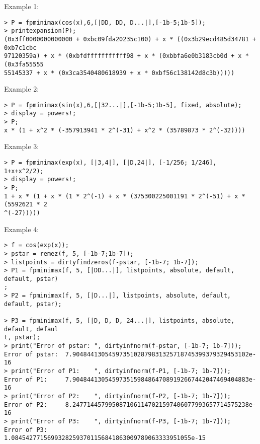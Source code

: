 \noindent Example 1: 
\begin{center}\begin{minipage}{15cm}\begin{Verbatim}[frame=single]
> P = fpminimax(cos(x),6,[|DD, DD, D...|],[-1b-5;1b-5]);
> printexpansion(P);
(0x3ff0000000000000 + 0xbc09fda20235c100) + x * ((0x3b29ecd485d34781 + 0xb7c1cbc
97120359a) + x * (0xbfdfffffffffff98 + x * (0xbbfa6e0b3183cb0d + x * (0x3fa55555
55145337 + x * (0x3ca3540480618939 + x * 0xbf56c138142d8c3b)))))
\end{Verbatim}
\end{minipage}\end{center}
\noindent Example 2: 
\begin{center}\begin{minipage}{15cm}\begin{Verbatim}[frame=single]
> P = fpminimax(sin(x),6,[|32...|],[-1b-5;1b-5], fixed, absolute);
> display = powers!;
> P;
x * (1 + x^2 * (-357913941 * 2^(-31) + x^2 * (35789873 * 2^(-32))))
\end{Verbatim}
\end{minipage}\end{center}
\noindent Example 3: 
\begin{center}\begin{minipage}{15cm}\begin{Verbatim}[frame=single]
> P = fpminimax(exp(x), [|3,4|], [|D,24|], [-1/256; 1/246], 1+x+x^2/2);
> display = powers!;
> P;
1 + x * (1 + x * (1 * 2^(-1) + x * (375300225001191 * 2^(-51) + x * (5592621 * 2
^(-27)))))
\end{Verbatim}
\end{minipage}\end{center}
\noindent Example 4: 
\begin{center}\begin{minipage}{15cm}\begin{Verbatim}[frame=single]
> f = cos(exp(x));
> pstar = remez(f, 5, [-1b-7;1b-7]);
> listpoints = dirtyfindzeros(f-pstar, [-1b-7; 1b-7]);
> P1 = fpminimax(f, 5, [|DD...|], listpoints, absolute, default, default, pstar)
;
> P2 = fpminimax(f, 5, [|D...|], listpoints, absolute, default, default, pstar);

> P3 = fpminimax(f, 5, [|D, D, D, 24...|], listpoints, absolute, default, defaul
t, pstar);
> print("Error of pstar: ", dirtyinfnorm(f-pstar, [-1b-7; 1b-7]));
Error of pstar:  7.9048441305459735102879831325718745399379329453102e-16
> print("Error of P1:    ", dirtyinfnorm(f-P1, [-1b-7; 1b-7]));
Error of P1:     7.9048441305459735159848647089192667442047469404883e-16
> print("Error of P2:    ", dirtyinfnorm(f-P2, [-1b-7; 1b-7]));
Error of P2:     8.2477144579950871061147021597406077993657714575238e-16
> print("Error of P3:    ", dirtyinfnorm(f-P3, [-1b-7; 1b-7]));
Error of P3:     1.08454277156993282593701156841863009789063333951055e-15
\end{Verbatim}
\end{minipage}\end{center}
